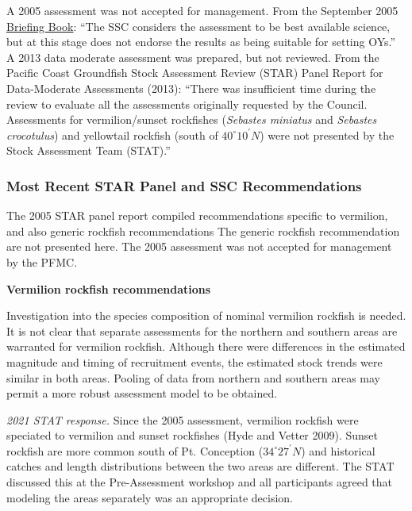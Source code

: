 \documentclass[11pt,
  english,
  a4paper,
]{article}
\begin{document}
A 2005 assessment was not accepted for management. From the September 2005 {\href{https://www.pcouncil.org/documents/2005/09/f-groundfish-management-september-2005.pdf/}{Briefing Book}\leavevmode\tagmcend\tagstructend}: ``The SSC considers the assessment to be best available science, but at this stage does not endorse the results as being suitable for setting OYs.'' A 2013 data moderate assessment was prepared, but not reviewed. From the Pacific Coast Groundfish Stock Assessment Review (STAR) Panel Report for Data-Moderate Assessments (2013): ``There was insufficient time during the review to evaluate all the assessments originally requested by the Council. Assessments for vermilion/sunset rockfishes (\emph{Sebastes miniatus} and \emph{Sebastes crocotulus}) and yellowtail rockfish (south of $40^\circ 10^\prime N$) were not presented by the Stock Assessment Team (STAT).''


\hypertarget{most-recent-star-panel-and-ssc-recommendations}{%
\subsubsection{Most Recent STAR Panel and SSC Recommendations}\label{most-recent-star-panel-and-ssc-recommendations}}

\leavevmode\tagmcend\tagstructend

The 2005 STAR panel report compiled recommendations specific to vermilion, and also generic rockfish recommendations The generic rockfish recommendation are not presented here. The 2005 assessment was not accepted for management by the PFMC.

\textbf{Vermilion rockfish recommendations}

Investigation into the species composition of nominal vermilion rockfish is needed. It is not clear that separate assessments for the northern and southern areas are warranted for vermilion rockfish. Although there were differences in the estimated magnitude and timing of recruitment events, the estimated stock trends were similar in both areas. Pooling of data from northern and southern areas may permit a more robust assessment model to be obtained.

\emph{2021 STAT response.} Since the 2005 assessment, vermilion rockfish were speciated to vermilion and sunset rockfishes {(Hyde and Vetter 2009)\leavevmode\tagmcend\tagstructend}. Sunset rockfish are more common south of Pt. Conception ($34^\circ 27^\prime N$) and historical catches and length distributions between the two areas are different. The STAT discussed this at the Pre-Assessment workshop and all participants agreed that modeling the areas separately was an appropriate decision.
\end{document}
